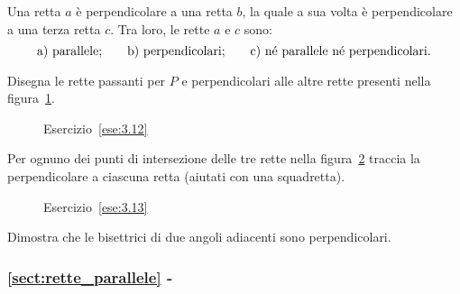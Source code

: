 \begin{esercizio}
\label{ese:3.11}
Una retta $a$ è perpendicolare a una retta $b$, la quale a sua volta è perpendicolare a una terza retta $c$. Tra loro, le rette $a$ e $c$ sono:
\[\text{a) parallele;\qquad b) perpendicolari;\qquad c) né parallele né perpendicolari.}\]
\end{esercizio}

\begin{esercizio}
\label{ese:3.12}
Disegna le rette passanti per $P$ e perpendicolari alle altre rette presenti nella figura~\ref{fig:ese3.12}.
\end{esercizio}
\begin{figure}[htb]
\centering
\caption{Esercizio~\ref{ese:3.12}}\label{fig:ese3.12}
\end{figure}

\begin{esercizio}
\label{ese:3.13}
Per ognuno dei punti di intersezione delle tre rette nella figura~\ref{fig:ese3.13} traccia la perpendicolare a ciascuna retta (aiutati con una squadretta).
\end{esercizio}
\begin{figure}[htb]
\centering
\caption{Esercizio~\ref{ese:3.13}}\label{fig:ese3.13}
\end{figure}

\begin{esercizio}
\label{ese:3.14}
Dimostra che le bisettrici di due angoli adiacenti sono perpendicolari.
\end{esercizio}

\begingroup
\hypersetup{linkcolor=black}
\subsubsection*{\ref{sect:rette_parallele} - }
\endgroup

